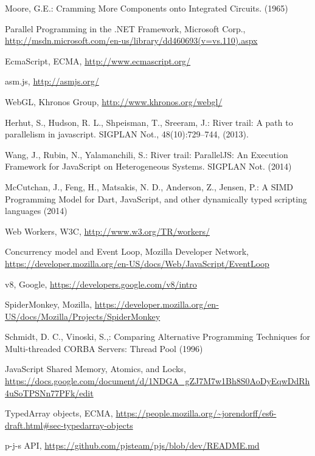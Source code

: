 \documentclass[runningheads,a4paper]{llncs}
\begin{document}
\begin{thebibliography}{4}

 Moore, G.E.: Cramming More Components onto Integrated Circuits. (1965)

 Parallel Programming in the .NET Framework, Microsoft Corp., \url{http://msdn.microsoft.com/en-us/library/dd460693(v=vs.110).aspx}

 EcmaScript, ECMA, \url{http://www.ecmascript.org/}

 asm.js, \url{http://asmjs.org/}

 WebGL, Khronos Group, \url{http://www.khronos.org/webgl/}

 Herhut, S., Hudson, R. L., Shpeisman, T., Sreeram, J.: River trail: A path to parallelism in javascript. SIGPLAN Not., 48(10):729--744, (2013).

 Wang, J., Rubin, N., Yalamanchili, S.: River trail: ParallelJS: An Execution Framework for JavaScript on Heterogeneous Systems. SIGPLAN Not. (2014)

 McCutchan, J., Feng, H., Matsakis, N. D., Anderson, Z., Jensen, P.: A SIMD Programming Model for Dart, JavaScript, and other dynamically typed scripting languages (2014)

 Web Workers, W3C, \url{http://www.w3.org/TR/workers/}

 Concurrency model and Event Loop, Mozilla Developer Network, \url{https://developer.mozilla.org/en-US/docs/Web/JavaScript/EventLoop}

 v8, Google, \url{https://developers.google.com/v8/intro}

 SpiderMonkey, Mozilla, \url{https://developer.mozilla.org/en-US/docs/Mozilla/Projects/SpiderMonkey}

 Schmidt, D. C., Vinoski, S.,: Comparing Alternative Programming Techniques for Multi-threaded CORBA Servers: Thread Pool (1996)

 JavaScript Shared Memory, Atomics, and Locks, \url{https://docs.google.com/document/d/1NDGA_gZJ7M7w1Bh8S0AoDyEqwDdRh4uSoTPSNn77PFk/edit}

 TypedArray objects, ECMA, \url{https://people.mozilla.org/~jorendorff/es6-draft.html#sec-typedarray-objects}

 p-j-s API, \url{https://github.com/pjsteam/pjs/blob/dev/README.md}


\end{thebibliography}
\end{document}
